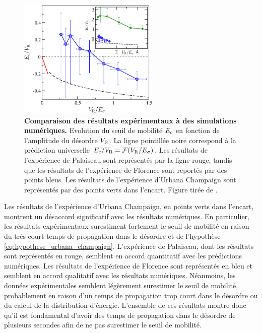 \begin{figure}
\centering
\includegraphics[width=0.6\textwidth]{Fig/Localisation/delande_expvsth.pdf}
\caption{\textbf{Comparaison des résultats expérimentaux à des simulations numériques.} Evolution du seuil de mobilité $E_{\mathrm{c}}$ en fonction de l'amplitude du désordre $V_{\mathrm{R}}$. La ligne pointillée noire correspond à la prédiction universelle $E_{\mathrm{c}}/V_{\mathrm{R}}=\mathcal{F}(V_{\mathrm{R}}/E_{\sigma})$. Les résultats de l'expérience de Palaiseau sont représentés par la ligne rouge, tandis que les résultats de l'expérience de Florence sont reportés par des points bleus. Les résultats de l'expérience d'Urbana Champaign sont représentés par des points verts dans l'encart. Figure tirée de \citep{pasek2017anderson}.}
\label{fig:seuil_mobilite_delande}
\end{figure}

Les résultats de l'expérience d'Urbana Champaign, en points verts dans l'encart, montrent un désaccord significatif avec les résultats numériques. En particulier, les résultats expérimentaux surestiment fortement le seuil de mobilité en raison du très court temps de propagation dans le désordre et de l'hypothèse \ref{eq:hypothese_urbana_champaign}. L'expérience de Palaiseau, dont les résultats sont représentés en rouge, semblent en accord quantitatif avec les prédictions numériques. Les résultats de l'expérience de Florence sont représentés en bleu et semblent en accord qualitatif avec les résultats numériques. Néanmoins, les données expérimentales semblent légèrement surestimer le seuil de mobilité, probablement en raison d'un temps de propagation trop court dans le désordre ou du calcul de la distribution d'énergie. L'ensemble de ces résultats montre donc qu'il est fondamental d'avoir des temps de propagation dans le désordre de plusieurs secondes afin de ne pas surestimer le seuil de mobilité.





